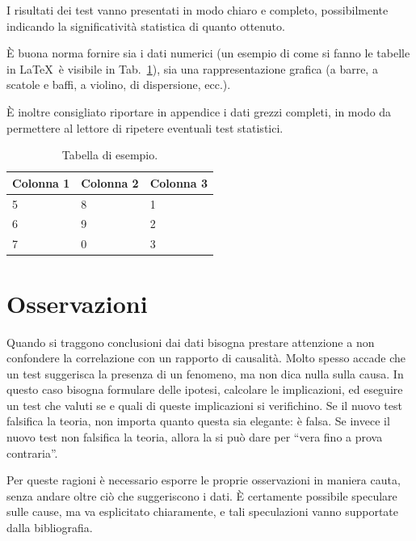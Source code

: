 \documentclass[12pt]{report}
\begin{document}
    I risultati dei test vanno presentati in modo chiaro e completo, possibilmente indicando la significatività statistica di quanto ottenuto.

    \`E buona norma fornire sia i dati numerici (un esempio di come si fanno le tabelle in \LaTeX\  è visibile in Tab.\ \ref{tab:sample}), sia una rappresentazione grafica (a barre, a scatole e baffi, a violino, di dispersione, ecc.).

    \`E inoltre consigliato riportare in appendice i dati grezzi completi, in modo da permettere al lettore di ripetere eventuali test statistici.

    \begin{table}
        \centering
        \begin{tabular}{|l|l|l|}
            \hline
            Colonna 1 & Colonna 2 & Colonna 3 \\ \hline
            5         & 8         & 1         \\
            6         & 9         & 2         \\
            7         & 0         & 3         \\ \hline
        \end{tabular}
        \caption{Tabella di esempio.}
        \label{tab:sample}
    \end{table}

    \section{Osservazioni}

    Quando si traggono conclusioni dai dati bisogna prestare attenzione a non confondere la correlazione con un rapporto di causalità. Molto spesso accade che un test suggerisca la presenza di un fenomeno, ma non dica nulla sulla causa. In questo caso bisogna formulare delle ipotesi, calcolare le implicazioni, ed eseguire un test che valuti se e quali di queste implicazioni si verifichino. Se il nuovo test falsifica la teoria, non importa quanto questa sia elegante: è falsa. Se invece il nuovo test non falsifica la teoria, allora la si può dare per ``vera fino a prova contraria''.

    Per queste ragioni è necessario esporre le proprie osservazioni in maniera cauta, senza andare oltre ciò che suggeriscono i dati. \`E certamente possibile speculare sulle cause, ma va esplicitato chiaramente, e tali speculazioni vanno supportate dalla bibliografia.

%
%
\end{document}
